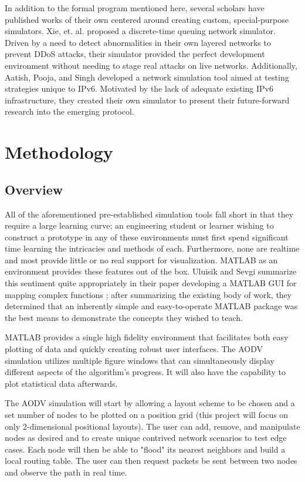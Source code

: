 \documentclass[conference]{IEEEtran}
\begin{document}
In addition to the formal program mentioned here, several scholars have published works of their own centered around creating custom, special-purpose simulators. Xie, et. al. \cite{8247856} proposed a discrete-time queuing network simulator. Driven by a need to detect abnormalities in their own layered networks to prevent DDoS attacks, their simulator provided the perfect development environment without needing to stage real attacks on live networks. Additionally, Aatish, Pooja, and Singh \cite{8071602} developed a network simulation tool aimed at testing strategies unique to IPv6. Motivated by the lack of adequate existing IPv6 infrastructure, they created their own simulator to present their future-forward research into the emerging protocol.

\section{Methodology}

\subsection{Overview}

All of the aforementioned pre-established simulation tools fall short in that they require a large learning curve; an engineering student or learner wishing to construct a prototype in any of these environments must first spend significant time learning the intricacies and methods of each. Furthermore, none are realtime and most provide little or no real support for visualization. MATLAB as an environment provides these features out of the box. Uluisik and Sevgi summarize this sentiment quite appropriately in their paper developing a MATLAB GUI for mapping complex functions \cite{matlab_gui}; after summarizing the existing body of work, they determined that an inherently simple and easy-to-operate MATLAB package was the best means to demonstrate the concepts they wished to teach. 

MATLAB provides a single high fidelity environment that facilitates both easy plotting of data and quickly creating robust user interfaces. The AODV simulation utilizes multiple figure windows that can simultaneously display different aspects of the algorithm's progress. It will also have the capability to plot statistical data afterwards.

The AODV simulation will start by allowing a layout scheme to be chosen and a set number of nodes to be plotted on a position grid (this project will focus on only 2-dimensional positional layouts). The user can add, remove, and manipulate nodes as desired and to create unique contrived network scenarios to test edge cases. Each node will then be able to "flood" its nearest neighbors and build a local routing table. The user can then request packets be sent between two nodes and observe the path in real time.
\end{document}
